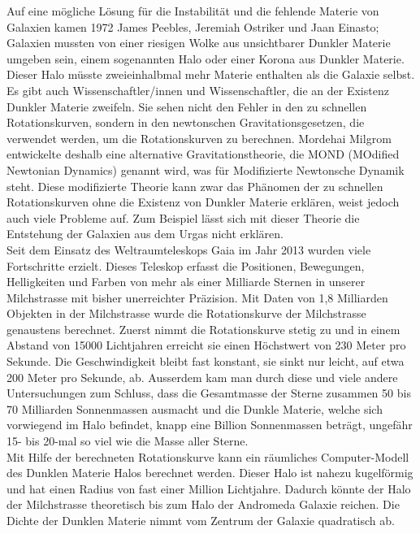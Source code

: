 Auf eine mögliche Lösung für die Instabilität und die fehlende Materie von Galaxien kamen 1972 James Peebles, Jeremiah Ostriker und Jaan Einasto; Galaxien mussten von einer riesigen Wolke aus unsichtbarer Dunkler Materie umgeben sein, einem sogenannten Halo oder einer Korona aus Dunkler Materie. Dieser Halo müsste zweieinhalbmal mehr Materie enthalten als die Galaxie selbst.\\  
Es gibt auch Wissenschaftler/innen und Wissenschaftler, die an der Existenz Dunkler Materie zweifeln. Sie sehen nicht den Fehler in den zu schnellen Rotationskurven, sondern in den newtonschen Gravitationsgesetzen, die verwendet werden, um die Rotationskurven zu berechnen. Mordehai Milgrom entwickelte deshalb eine alternative Gravitationstheorie, die \glqq MOND\grqq{} (\glqq MOdified Newtonian Dynamics\grqq{}) genannt wird, was für \glqq Modifizierte Newtonsche Dynamik\grqq{} steht.
Diese modifizierte Theorie kann zwar das Phänomen der zu schnellen Rotationskurven ohne die Existenz von Dunkler Materie erklären, weist jedoch auch viele Probleme auf. Zum Beispiel lässt sich mit dieser Theorie die Entstehung der Galaxien aus dem Urgas nicht erklären.\\
Seit dem Einsatz des Weltraumteleskops Gaia im Jahr 2013 wurden viele Fortschritte erzielt. Dieses Teleskop erfasst die Positionen, Bewegungen, Helligkeiten und Farben von mehr als einer Milliarde Sternen in unserer Milchstrasse mit bisher unerreichter Präzision. Mit Daten von 1,8 Milliarden Objekten in der Milchstrasse wurde die Rotationskurve der Milchstrasse genaustens berechnet.
Zuerst nimmt die Rotationskurve stetig zu und in einem Abstand von 15000 Lichtjahren erreicht sie einen Höchstwert von 230 Meter pro Sekunde. Die Geschwindigkeit bleibt fast konstant, sie sinkt nur leicht, auf etwa 200 Meter pro Sekunde, ab. Ausserdem kam man durch diese und viele andere Untersuchungen zum Schluss, dass die Gesamtmasse der Sterne zusammen 50 bis 70 Milliarden Sonnenmassen ausmacht und die Dunkle Materie, welche sich vorwiegend im Halo befindet, knapp eine Billion Sonnenmassen beträgt, ungefähr 15- bis 20-mal so viel wie die Masse aller Sterne.\\
Mit Hilfe der berechneten Rotationskurve kann ein räumliches Computer-Modell des Dunklen Materie Halos berechnet werden.
Dieser Halo ist nahezu kugelförmig und hat einen Radius von fast einer Million Lichtjahre. Dadurch könnte der Halo der Milchstrasse theoretisch bis zum Halo der Andromeda Galaxie reichen. Die Dichte der Dunklen Materie nimmt vom Zentrum der Galaxie quadratisch ab.
